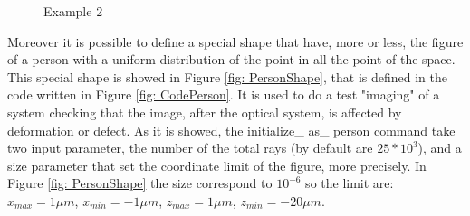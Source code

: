 \begin{figure}[H]
%
\centering
%
\quad
%
%
\caption{Example 2}
\label{fig :p2}
\end{figure}
Moreover it is possible to define a special shape that have, more or less, the figure of a person with a uniform distribution of the point in all the point of the space. This special shape is showed in Figure \ref{fig: PersonShape}, that is defined in the code written in Figure \ref{fig: CodePerson}. It is used to do a test "imaging" of a system checking that the image, after the optical system, is affected by deformation or defect. As it is showed, the initialize\_ as\_ person command take two input parameter, the number of the total rays (by default are $25*10^3 $), and a size parameter that set the coordinate limit of the figure, more precisely. In Figure \ref{fig: PersonShape} the size correspond to $10^{-6} $ so the limit are: $x_{max} =  1\mu m $, $x_{min} = -1\mu m $, $z_{max} = 1\mu m $, $z_{min} = - 20\mu m $.
